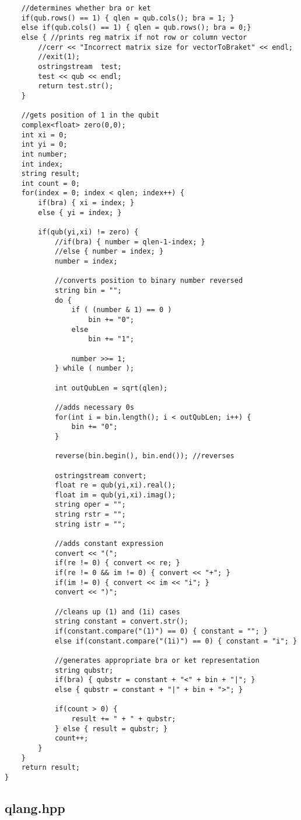 \begin{lstlisting}
	//determines whether bra or ket
	if(qub.rows() == 1) { qlen = qub.cols(); bra = 1; }
	else if(qub.cols() == 1) { qlen = qub.rows(); bra = 0;}
	else { //prints reg matrix if not row or column vector
		//cerr << "Incorrect matrix size for vectorToBraket" << endl;
		//exit(1);
		ostringstream  test;
		test << qub << endl;
		return test.str();
	}

	//gets position of 1 in the qubit
	complex<float> zero(0,0);
	int xi = 0;
	int yi = 0;
	int number;
	int index;
	string result;
	int count = 0;
	for(index = 0; index < qlen; index++) {
		if(bra) { xi = index; }
		else { yi = index; }

		if(qub(yi,xi) != zero) {
			//if(bra) { number = qlen-1-index; }
			//else { number = index; }
			number = index;

			//converts position to binary number reversed
			string bin = "";
			do {
				if ( (number & 1) == 0 )
					bin += "0";
				else
					bin += "1";

				number >>= 1;
			} while ( number );

			int outQubLen = sqrt(qlen);

			//adds necessary 0s
			for(int i = bin.length(); i < outQubLen; i++) {
				bin += "0";
			}

			reverse(bin.begin(), bin.end()); //reverses

			ostringstream convert;
			float re = qub(yi,xi).real();
			float im = qub(yi,xi).imag();
			string oper = "";
			string rstr = "";
			string istr = "";

			//adds constant expression
			convert << "(";
			if(re != 0) { convert << re; }
			if(re != 0 && im != 0) { convert << "+"; }
			if(im != 0) { convert << im << "i"; }
			convert << ")";

			//cleans up (1) and (1i) cases
			string constant = convert.str();
			if(constant.compare("(1)") == 0) { constant = ""; }
			else if(constant.compare("(1i)") == 0) { constant = "i"; }

			//generates appropriate bra or ket representation
			string qubstr;
			if(bra) { qubstr = constant + "<" + bin + "|"; }
			else { qubstr = constant + "|" + bin + ">"; }

			if(count > 0) {
				result += " + " + qubstr;
			} else { result = qubstr; }
			count++;
		}
	}
	return result;
}
\end{lstlisting}
\subsection{qlang.hpp}

